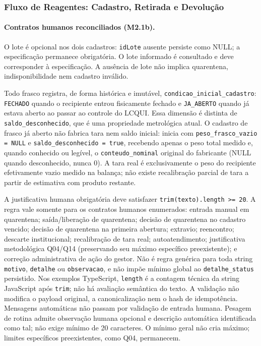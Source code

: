 \subsubsection{Fluxo de Reagentes: Cadastro, Retirada e Devolução}

\paragraph{Contratos humanos reconciliados (M2.1b).}
O lote é opcional nos dois cadastros: \texttt{idLote} ausente persiste como NULL; a especificação permanece obrigatória. O lote informado é consultado e deve corresponder à especificação. A ausência de lote não implica quarentena, indisponibilidade nem cadastro inválido.

Todo frasco registra, de forma histórica e imutável, \texttt{condicao\_inicial\_cadastro}: \texttt{FECHADO} quando o recipiente entrou fisicamente fechado e \texttt{JA\_ABERTO} quando já estava aberto ao passar ao controle do LCQUI. Essa dimensão é distinta de \texttt{saldo\_desconhecido}, que é uma propriedade metrológica atual. O cadastro de frasco já aberto não fabrica tara nem saldo inicial: inicia com \texttt{peso\_frasco\_vazio = NULL} e \texttt{saldo\_desconhecido = true}, recebendo apenas o peso total medido e, quando conhecido ou legível, o \texttt{conteudo\_nominal} original do fabricante (NULL quando desconhecido, nunca $0$). A tara real é exclusivamente o peso do recipiente efetivamente vazio medido na balança; não existe recalibração parcial de tara a partir de estimativa com produto restante.

A justificativa humana obrigatória deve satisfazer \texttt{trim(texto).length >= 20}. A regra vale somente para os contratos humanos enumerados: entrada manual em quarentena; saída/liberação de quarentena; decisão de quarentena no cadastro vencido; decisão de quarentena na primeira abertura; extravio; reencontro; descarte institucional; recalibração de tara real; autoatendimento; justificativa metodológica Q04/Q14 (preservando seu máximo específico preexistente); e correção administrativa de ação do gestor. Não é regra genérica para toda string \texttt{motivo}, \texttt{detalhe} ou \texttt{observacao}, e não impõe mínimo global ao \texttt{detalhe\_status} persistido. Nos exemplos TypeScript, \texttt{length} é a contagem técnica da string JavaScript após \texttt{trim}; não há avaliação semântica do texto. A validação não modifica o payload original, a canonicalização nem o hash de idempotência. Mensagens automáticas não passam por validação de entrada humana. Pesagem de rotina admite observação humana opcional e descrição automática identificada como tal; não exige mínimo de 20 caracteres. O mínimo geral não cria máximo; limites específicos preexistentes, como Q04, permanecem.

